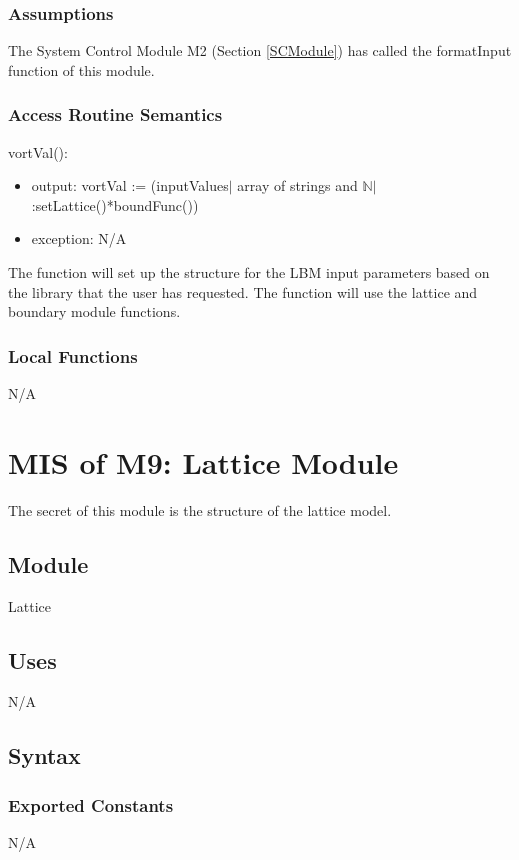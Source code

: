 \documentclass[12pt, titlepage]{article}
\begin{document}
\subsubsection{Assumptions}

The System Control Module M2 (Section \ref{SCModule}) has called the formatInput function of this module.

\subsubsection{Access Routine Semantics}

\noindent vortVal():
\begin{itemize}
	\item output: vortVal := (inputValues$|$ array of strings and $\mathbb{N}$$|$:setLattice()*boundFunc())
	\item exception: N/A
\end{itemize}

The function will set up the structure for the LBM input parameters based on the library that the user has requested. The function will use the lattice and boundary module functions.

\subsubsection{Local Functions}
N/A

\newpage

\section{MIS of M9: Lattice Module} \label{LAModule} 

The secret of this module is the structure of the lattice model.

\subsection{Module}

Lattice

\subsection{Uses}
N/A

\subsection{Syntax}

\subsubsection{Exported Constants}
N/A
\end{document}
